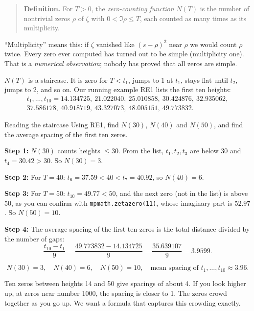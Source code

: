 \begin{quote}
\textbf{Definition.} For $T>0$, the \emph{zero-counting function} $N(T)$ is the number of nontrivial zeros $\rho$ of $\zeta$ with $0<\Im\rho\le T$, each counted as many times as its multiplicity.
\end{quote}

``Multiplicity'' means this: if $\zeta$ vanished like $(s-\rho)^2$ near $\rho$ we would count $\rho$ twice. Every zero ever computed has turned out to be simple (multiplicity one). That is a \emph{numerical observation}; nobody has proved that all zeros are simple.

$N(T)$ is a staircase. It is zero for $T<t_1$, jumps to 1 at $t_1$, stays flat until $t_2$, jumps to 2, and so on. Our running example RE1 lists the first ten heights:
\begin{multline}
t_1,\dots,t_{10}=14.134725,\ 21.022040,\ 25.010858,\ 30.424876,\ 32.935062,\\
37.586178,\ 40.918719,\ 43.327073,\ 48.005151,\ 49.773832.
\label{eq:counting-zeros-RE1}
\end{multline}

\begin{sample}{Reading the staircase}
Using RE1, find $N(30)$, $N(40)$ and $N(50)$, and find the average spacing of the first ten zeros.

\textbf{Step 1:} $N(30)$ counts heights $\le30$. From the list, $t_1,t_2,t_3$ are below 30 and $t_4=30.42>30$. So $N(30)=3$.

\textbf{Step 2:} For $T=40$: $t_6=37.59<40<t_7=40.92$, so $N(40)=6$.

\textbf{Step 3:} For $T=50$: $t_{10}=49.77<50$, and the next zero (not in the list) is above 50, as you can confirm with \texttt{mpmath.zetazero(11)}, whose imaginary part is $52.97$. So $N(50)=10$.

\textbf{Step 4:} The average spacing of the first ten zeros is the total distance divided by the number of gaps:
\[
\frac{t_{10}-t_1}{9}=\frac{49.773832-14.134725}{9}=\frac{35.639107}{9}=3.9599.
\]

\[
\boxed{N(30)=3,\quad N(40)=6,\quad N(50)=10,\quad \text{mean spacing of } t_1,\dots,t_{10}\approx 3.96.}
\]
\end{sample}

Ten zeros between heights 14 and 50 give spacings of about 4. If you look higher up, at zeros near number 1000, the spacing is closer to 1. The zeros crowd together as you go up. We want a formula that captures this crowding exactly.

